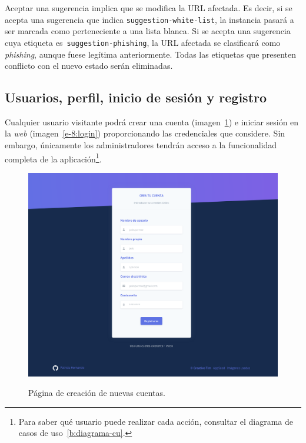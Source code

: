 Aceptar una sugerencia implica que se modifica la URL afectada. Es decir, si se acepta una sugerencia que indica \texttt{suggestion-white-list}, la instancia pasará a ser marcada como perteneciente a una lista blanca. Si se acepta una sugerencia cuya etiqueta es~\texttt{suggestion-phishing}, la URL afectada se clasificará como \textit{phishing}, aunque fuese legítima anteriormente. Todas las etiquetas que presenten conflicto con el nuevo estado serán eliminadas.

\subsection{Usuarios, perfil, inicio de sesión y registro}

Cualquier usuario visitante podrá crear una cuenta (imagen~\ref{e-8:register}) e iniciar sesión en la \textit{web} (imagen~\ref{e-8:login}) proporcionando las credenciales que considere. Sin embargo, únicamente los administradores tendrán acceso a la funcionalidad completa de la aplicación\footnote{Para saber qué usuario puede realizar cada acción, consultar el diagrama de casos de uso~\ref{b:diagrama-cu}.}.

\begin{figure}[h]
	\caption[Manual de usuario: crear nueva cuenta]{Página de creación de nuevas cuentas.}
	\centering
	\includegraphics[scale=0.25]{../img/anexos/user_guide/8_register}
	\label{e-8:register}
\end{figure}

